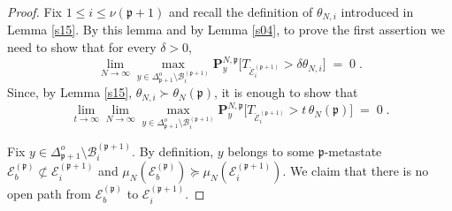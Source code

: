 \documentclass[reqno]{amsart}
\begin{document}
\begin{proof}
Fix $1\le i\le \nu ({{\mathfrak p}}+1)$ and recall the definition of
$\theta_{N,i}$ introduced in Lemma \ref{s15}. By this lemma and by
Lemma \ref{s04}, to prove the first assertion we need to show that for
every $\delta>0$, 
\begin{equation*}
\lim_{N\to\infty} \max_{y\in \Delta^o_{{{\mathfrak p}}+1} \setminus {{\mathcal B}}^{({{\mathfrak p}}
  +1)}_i} {{\mathbf P}}^{N, {{\mathfrak p}}}_y \big[ T_{\breve{{{\mathcal E}}}^{({{\mathfrak p}} +1)}_i} > 
\delta \theta_{N,i} \big] \;=\; 0\; .
\end{equation*}
Since, by Lemma \ref{s15}, $\theta_{N,i} \succ \theta_N({{\mathfrak p}})$, it
is enough to show that 
\begin{equation*}
\lim_{t\to\infty} 
\lim_{N\to\infty} \max_{y\in \Delta^o_{{{\mathfrak p}}+1} \setminus {{\mathcal B}}^{({{\mathfrak p}}
  +1)}_i} {{\mathbf P}}^{N, {{\mathfrak p}}}_y \big[ T_{\breve{{{\mathcal E}}}^{({{\mathfrak p}} +1)}_i} > 
t\,\theta_N({{\mathfrak p}})  \big] \;=\; 0\; .
\end{equation*}

Fix $y\in \Delta^o_{{{\mathfrak p}}+1}\setminus {{\mathcal B}}^{({{\mathfrak p}} +1)}_i$. By
definition, $y$ belongs to some ${{\mathfrak p}}$-metastate ${{\mathcal E}}^{({{\mathfrak p}})}_b
\not \subset {{\mathcal E}}^{({{\mathfrak p}} +1)}_i$ and $\mu_N({{\mathcal E}}^{({{\mathfrak p}})}_b) \succeq
\mu_N({{\mathcal E}}^{({{\mathfrak p}} +1)}_i)$. We claim that there is no open path from 
${{\mathcal E}}^{({{\mathfrak p}})}_b$ to ${{\mathcal E}}^{({{\mathfrak p}} +1)}_i$.


\end{proof}
\end{document}
